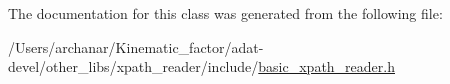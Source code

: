The documentation for this class was generated from the following file\+:\begin{DoxyCompactItemize}
\item 
/\+Users/archanar/\+Kinematic\+\_\+factor/adat-\/devel/other\+\_\+libs/xpath\+\_\+reader/include/\mbox{\hyperlink{adat-devel_2other__libs_2xpath__reader_2include_2basic__xpath__reader_8h}{basic\+\_\+xpath\+\_\+reader.\+h}}\end{DoxyCompactItemize}
